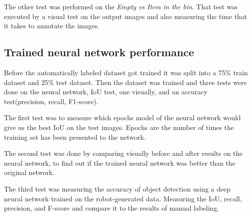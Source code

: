The other test was performed on the \textit{Empty vs Item in the bin}. That test was executed by a visual test on the output images and also measuring the time that it takes to annotate the images.

\subsection{Trained neural network performance}
Before the automatically labeled dataset got trained it was split into a 75\% train dataset and 25\% test dataset. Then the dataset was trained and three tests were done on the neural network, IoU test, one visually, and an accuracy test(precision, recall, F1-score).


The first test was to measure which epochs model of the neural network would give us the best IoU on the test images. Epochs are the number of times the training set has been presented to the network.

The second test was done by comparing visually before and after results on the neural network, to find out if the trained neural network was better than the original network.

The third test was measuring the accuracy of object detection using a deep neural network trained on the robot-generated data. Measuring the IoU, recall, precision, and F-score and compare it to the results of manual labeling. 